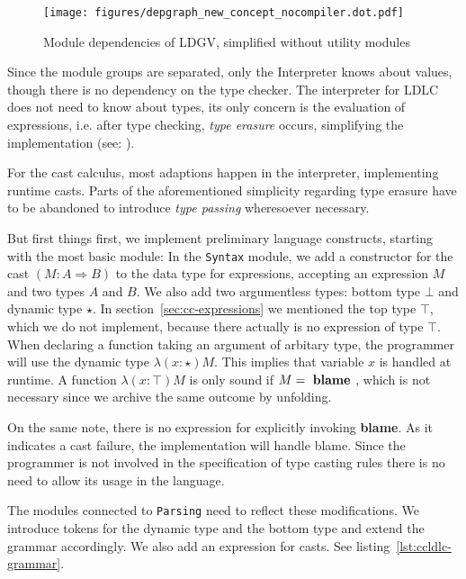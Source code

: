 \begin{figure}
 \centering
 \texttt{[image: figures/depgraph\_new\_concept\_nocompiler.dot.pdf]}
 \caption[Module dependencies of LDGV]{Module dependencies of LDGV, simplified without utility modules}
 \label{fig:dependency-graph}
\end{figure}

Since the module groups are separated, only the Interpreter knows about values, though there is no dependency on the type checker. The interpreter for LDLC does not need to know about types, its only concern is the evaluation of expressions, i.e. after type checking, \emph{type erasure} occurs, simplifying the implementation (see: \cite{crary2002}).

For the cast calculus, most adaptions happen in the interpreter, implementing runtime casts. Parts of the aforementioned simplicity regarding type erasure have to be abandoned to introduce \emph{type passing} wheresoever necessary.

But first things first, we implement preliminary language constructs, starting with the most basic module: In the \texttt{Syntax} module, we add a constructor for the cast $(M : A \Rightarrow B)$ to the data type for expressions, accepting an expression $M$ and two types $A$ and $B$. We also add two argumentless types: bottom type $\bot$ and dynamic type $\star$. In section~\ref{sec:cc-expressions} we mentioned the top type $\top$, which we do not implement, because there actually is no expression of type $\top$. When declaring a function taking an argument of arbitary type, the programmer will use the dynamic type $\lambda(x:\star)M$. This implies that variable $x$ is handled at runtime. A function $\lambda(x:\top)M$ is only sound if $M = \text{ \textbf{blame} }$, which is not necessary since we archive the same outcome by unfolding.

On the same note, there is no expression for explicitly invoking \textbf{blame}. As it indicates a cast failure, the implementation will handle blame. Since the programmer is not involved in the specification of type casting rules there is no need to allow its usage in the language.

The modules connected to \texttt{Parsing} need to reflect these modifications. We introduce tokens for the dynamic type and the bottom type and extend the grammar accordingly. We also add an expression for casts. See listing~\ref{lst:ccldlc-grammar}.

